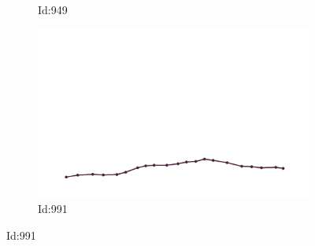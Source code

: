 \documentclass[12pt,twoside]{report}
\begin{document}
\begin{figure}
\begin{subfigure}[b]{0.20\textwidth}
\caption{Id:949}
\end{subfigure}
\begin{subfigure}[b]{0.20\textwidth}
\centering
\includegraphics[width=\textwidth]{../trajectories/991.png}
\caption{Id:991}
\end{subfigure}
\end{figure}
\end{document}
